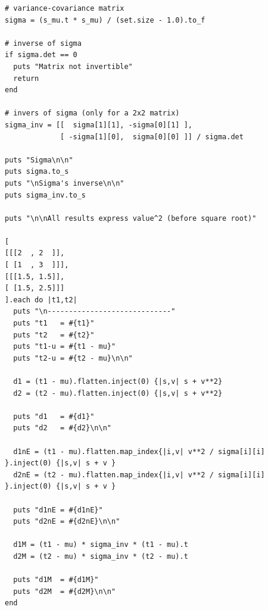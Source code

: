 \documentclass[11pt,twocolumn]{amsart} %
\begin{document}
\begin{verbatim}
# variance-covariance matrix
sigma = (s_mu.t * s_mu) / (set.size - 1.0).to_f

# inverse of sigma
if sigma.det == 0
  puts "Matrix not invertible"
  return
end

# invers of sigma (only for a 2x2 matrix)
sigma_inv = [[  sigma[1][1], -sigma[0][1] ],
             [ -sigma[1][0],  sigma[0][0] ]] / sigma.det

puts "Sigma\n\n"
puts sigma.to_s
puts "\nSigma's inverse\n\n"
puts sigma_inv.to_s

puts "\n\nAll results express value^2 (before square root)"

[
[[[2  , 2  ]],
[ [1  , 3  ]]],
[[[1.5, 1.5]],
[ [1.5, 2.5]]]
].each do |t1,t2|
  puts "\n-----------------------------"
  puts "t1   = #{t1}"
  puts "t2   = #{t2}"
  puts "t1-u = #{t1 - mu}"
  puts "t2-u = #{t2 - mu}\n\n"

  d1 = (t1 - mu).flatten.inject(0) {|s,v| s + v**2} 
  d2 = (t2 - mu).flatten.inject(0) {|s,v| s + v**2}

  puts "d1   = #{d1}"
  puts "d2   = #{d2}\n\n"

  d1nE = (t1 - mu).flatten.map_index{|i,v| v**2 / sigma[i][i] }.inject(0) {|s,v| s + v } 
  d2nE = (t2 - mu).flatten.map_index{|i,v| v**2 / sigma[i][i] }.inject(0) {|s,v| s + v } 

  puts "d1nE = #{d1nE}"
  puts "d2nE = #{d2nE}\n\n"

  d1M = (t1 - mu) * sigma_inv * (t1 - mu).t
  d2M = (t2 - mu) * sigma_inv * (t2 - mu).t

  puts "d1M  = #{d1M}"
  puts "d2M  = #{d2M}\n\n"
end
\end{verbatim}
\end{document}

